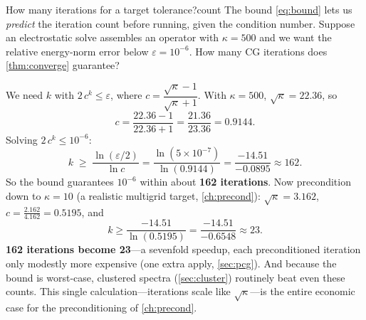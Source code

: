 \begin{workedexample}{How many iterations for a target tolerance?}{count}
The bound \eqref{eq:bound} lets us \emph{predict} the iteration count before
running, given the condition number. Suppose an electrostatic solve assembles an
operator with $\kappa=500$ and we want the relative energy-norm error below
$\varepsilon=10^{-6}$. How many CG iterations does \cref{thm:converge} guarantee?

\tcblower
We need $k$ with $2\,c^{k}\le\varepsilon$, where
$c=\dfrac{\sqrt\kappa-1}{\sqrt\kappa+1}$. With $\kappa=500$,
$\sqrt\kappa=22.36$, so
\[
  c = \frac{22.36-1}{22.36+1} = \frac{21.36}{23.36} = 0.9144 .
\]
Solving $2\,c^{k}\le10^{-6}$:
\[
  k \;\ge\; \frac{\ln(\varepsilon/2)}{\ln c}
    = \frac{\ln(5\times10^{-7})}{\ln(0.9144)}
    = \frac{-14.51}{-0.0895}
    \approx 162 .
\]
So the bound guarantees $10^{-6}$ within about \textbf{162 iterations}. Now
precondition down to $\kappa=10$ (a realistic multigrid target,
\cref{ch:precond}): $\sqrt\kappa=3.162$,
$c=\tfrac{2.162}{4.162}=0.5195$, and
\[
  k \ge \frac{-14.51}{\ln(0.5195)} = \frac{-14.51}{-0.6548}\approx 23 .
\]
\textbf{162 iterations become 23}---a sevenfold speedup, each preconditioned
iteration only modestly more expensive (one extra apply, \cref{sec:pcg}). And
because the bound is worst-case, clustered spectra (\cref{sec:cluster}) routinely
beat even these counts. This single calculation---iterations scale like
$\sqrt\kappa$---is the entire economic case for the preconditioning of
\cref{ch:precond}.
\end{workedexample}

